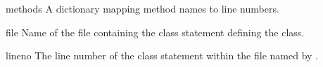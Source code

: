 \begin{memberdesc}{methods}
  A dictionary mapping method names to line numbers.
\end{memberdesc}

\begin{memberdesc}{file}
  Name of the file containing the class statement defining the class.
\end{memberdesc}

\begin{memberdesc}{lineno}
  The line number of the class statement within the file named by
  .
\end{memberdesc}
